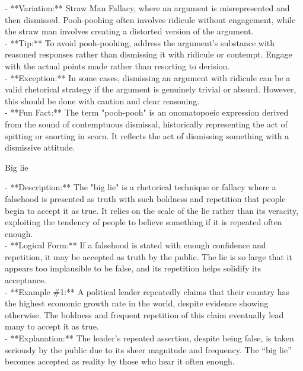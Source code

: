 \documentclass[a4paper,12pt,single,pdftex]{scrartcl}
\begin{document}
{    
      - **Variation:** Straw Man Fallacy, where an argument is misrepresented and then dismissed. Pooh-poohing often involves ridicule without engagement, while the straw man involves creating a distorted version of the argument.
    \\

    
      - **Tip:** To avoid pooh-poohing, address the argument’s substance with reasoned responses rather than dismissing it with ridicule or contempt. Engage with the actual points made rather than resorting to derision.
    \\

    
      - **Exception:** In some cases, dismissing an argument with ridicule can be a valid rhetorical strategy if the argument is genuinely trivial or absurd. However, this should be done with caution and clear reasoning.
    \\

    
      - **Fun Fact:** The term "pooh-pooh" is an onomatopoeic expression derived from the sound of contemptuous dismissal, historically representing the act of spitting or snorting in scorn. It reflects the act of dismissing something with a dismissive attitude.
    \\

  }


Big lie
    
      - **Description:** The "big lie" is a rhetorical technique or fallacy where a falsehood is presented as truth with such boldness and repetition that people begin to accept it as true. It relies on the scale of the lie rather than its veracity, exploiting the tendency of people to believe something if it is repeated often enough.
    \\

    
      - **Logical Form:** If a falsehood is stated with enough confidence and repetition, it may be accepted as truth by the public. The lie is so large that it appears too implausible to be false, and its repetition helps solidify its acceptance.
    \\

    
      - **Example \#1:** A political leader repeatedly claims that their country has the highest economic growth rate in the world, despite evidence showing otherwise. The boldness and frequent repetition of this claim eventually lead many to accept it as true.
    \\

    
      - **Explanation:** The leader’s repeated assertion, despite being false, is taken seriously by the public due to its sheer magnitude and frequency. The “big lie” becomes accepted as reality by those who hear it often enough.
    \\
\end{document}

